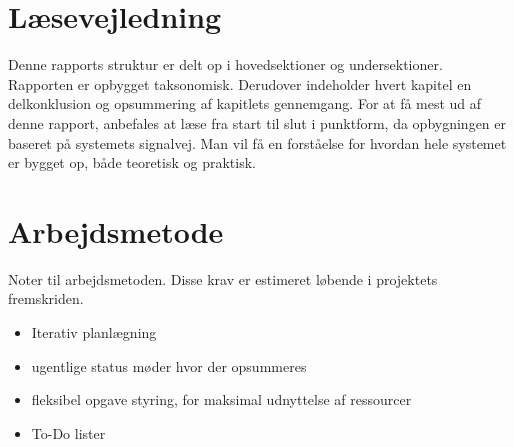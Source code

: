 \section{Læsevejledning}
Denne rapports struktur er delt op i hovedsektioner og undersektioner.
Rapporten er opbygget taksonomisk. 
Derudover indeholder hvert kapitel en delkonklusion og opsummering af kapitlets gennemgang.
For at få mest ud af denne rapport, anbefales at læse fra start til slut i punktform, da opbygningen er baseret på systemets signalvej.
Man vil få en forståelse for hvordan hele systemet er bygget op, både teoretisk og praktisk. 


\section{Arbejdsmetode}
Noter til arbejdsmetoden.
Disse krav er estimeret løbende i projektets fremskriden.
\begin{itemize}
	\item Iterativ planlægning
	\item ugentlige status møder hvor der opsummeres
	\item fleksibel opgave styring, for maksimal udnyttelse af ressourcer 
	\item To-Do lister
\end{itemize}